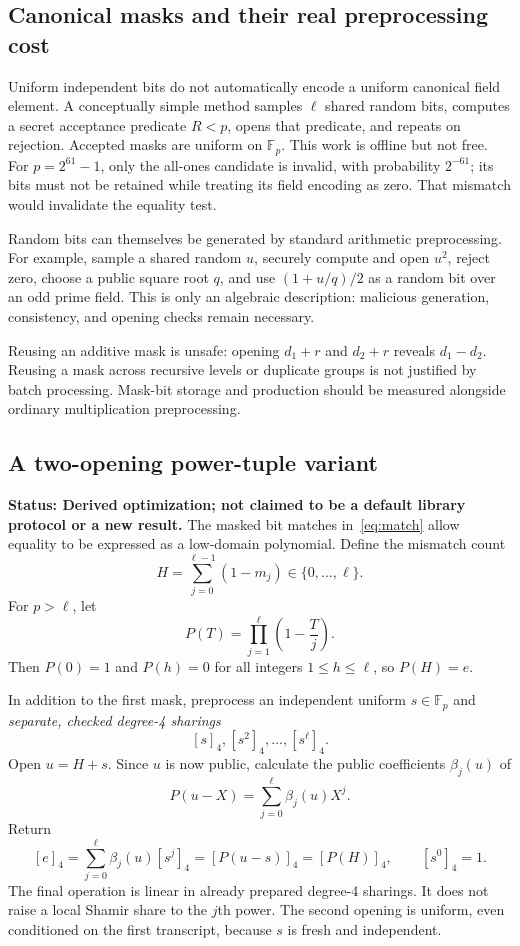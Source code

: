 \documentclass[11pt]{article}
\newcommand{\F}{\mathbb F}
\newcommand{\sh}[1]{\left[#1\right]_4}
\newcommand{\status}[1]{\textbf{Status: #1.}}
\begin{document}
\subsection{Canonical masks and their real preprocessing cost}

Uniform independent bits do not automatically encode a uniform canonical field
element. A conceptually simple method samples $\ell$ shared random bits,
computes a secret acceptance predicate $R<p$, opens that predicate, and repeats
on rejection. Accepted masks are uniform on $\F_p$. This work is offline but not
free. For $p=2^{61}-1$, only the all-ones candidate is invalid, with probability
$2^{-61}$; its bits must not be retained while treating its field encoding as
zero. That mismatch would invalidate the equality test.

Random bits can themselves be generated by standard arithmetic preprocessing.
For example, sample a shared random $u$, securely compute and open $u^2$, reject
zero, choose a public square root $q$, and use $(1+u/q)/2$ as a random bit over
an odd prime field. This is only an algebraic description: malicious generation,
consistency, and opening checks remain necessary.

Reusing an additive mask is unsafe: opening $d_1+r$ and $d_2+r$ reveals
$d_1-d_2$. Reusing a mask across recursive levels or duplicate groups is not
justified by batch processing. Mask-bit storage and production should be measured
alongside ordinary multiplication preprocessing.

\subsection{A two-opening power-tuple variant}\label{sec:power}

\status{Derived optimization; not claimed to be a default library protocol or a new result}
The masked bit matches in~\eqref{eq:match} allow equality to be expressed as a
low-domain polynomial. Define the mismatch count
\[
H=\sum_{j=0}^{\ell-1}(1-m_j)\in\{0,\ldots,\ell\}.
\]
For $p>\ell$, let
\begin{equation}
P(T)=\prod_{j=1}^{\ell}\left(1-\frac{T}{j}\right).
\label{eq:indicator-poly}
\end{equation}
Then $P(0)=1$ and $P(h)=0$ for all integers $1\leq h\leq\ell$, so $P(H)=e$.

In addition to the first mask, preprocess an independent uniform $s\in\F_p$
and \emph{separate, checked degree-4 sharings}
\[
\sh s,\sh{s^2},\ldots,\sh{s^\ell}.
\]
Open $u=H+s$. Since $u$ is now public, calculate the public coefficients
$\beta_j(u)$ of
\[
P(u-X)=\sum_{j=0}^{\ell}\beta_j(u)X^j.
\]
Return
\begin{equation}
\sh e=\sum_{j=0}^{\ell}\beta_j(u)\sh{s^j}
=\sh{P(u-s)}=\sh{P(H)},\qquad \sh{s^0}=1.
\label{eq:power-eq}
\end{equation}
The final operation is linear in already prepared degree-4 sharings. It does not
raise a local Shamir share to the $j$th power. The second opening is uniform,
even conditioned on the first transcript, because $s$ is fresh and independent.
\end{document}
